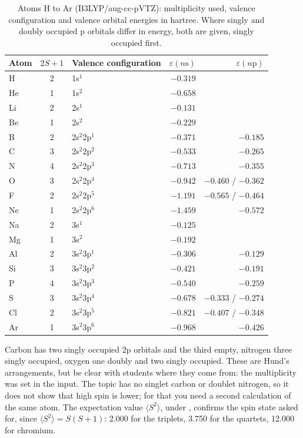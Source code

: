 \begin{table}[htb]
	\centering\small
	\caption{Atoms H to Ar (B3LYP/aug-cc-pVTZ): multiplicity used, valence configuration and valence orbital energies in hartree. Where singly and doubly occupied p orbitals differ in energy, both are given, singly occupied first.}
	\label{tab:pt-config}
	\begin{tabular}{lcl rr}
		\hline
		Atom & $2S+1$ & Valence configuration & $\varepsilon(n\mathrm{s})$ & $\varepsilon(n\mathrm{p})$ \\
		\hline
		H  & 2 & 1s$^1$         & $-0.319$ & \\
		He & 1 & 1s$^2$         & $-0.658$ & \\
		Li & 2 & 2s$^1$         & $-0.131$ & \\
		Be & 1 & 2s$^2$         & $-0.229$ & \\
		B  & 2 & 2s$^2$2p$^1$   & $-0.371$ & $-0.185$ \\
		C  & 3 & 2s$^2$2p$^2$   & $-0.533$ & $-0.265$ \\
		N  & 4 & 2s$^2$2p$^3$   & $-0.713$ & $-0.355$ \\
		O  & 3 & 2s$^2$2p$^4$   & $-0.942$ & $-0.460$ / $-0.362$ \\
		F  & 2 & 2s$^2$2p$^5$   & $-1.191$ & $-0.565$ / $-0.464$ \\
		Ne & 1 & 2s$^2$2p$^6$   & $-1.459$ & $-0.572$ \\
		Na & 2 & 3s$^1$         & $-0.125$ & \\
		Mg & 1 & 3s$^2$         & $-0.192$ & \\
		Al & 2 & 3s$^2$3p$^1$   & $-0.306$ & $-0.129$ \\
		Si & 3 & 3s$^2$3p$^2$   & $-0.421$ & $-0.191$ \\
		P  & 4 & 3s$^2$3p$^3$   & $-0.540$ & $-0.259$ \\
		S  & 3 & 3s$^2$3p$^4$   & $-0.678$ & $-0.333$ / $-0.274$ \\
		Cl & 2 & 3s$^2$3p$^5$   & $-0.821$ & $-0.407$ / $-0.348$ \\
		Ar & 1 & 3s$^2$3p$^6$   & $-0.968$ & $-0.426$ \\
		\hline
	\end{tabular}
\end{table}

Carbon has two singly occupied 2p orbitals and the third empty, nitrogen three singly occupied, oxygen one doubly and two singly occupied. These are Hund's arrangements, but be clear with students where they come from: the multiplicity was set in the input. The topic has no singlet carbon or doublet nitrogen, so it does not show that high spin is lower; for that you need a second calculation of the same atom. The expectation value $\langle S^2 \rangle$, under , confirms the spin state asked for, since $\langle S^2 \rangle = S(S+1)$: 2.000 for the triplets, 3.750 for the quartets, 12.000 for chromium.

